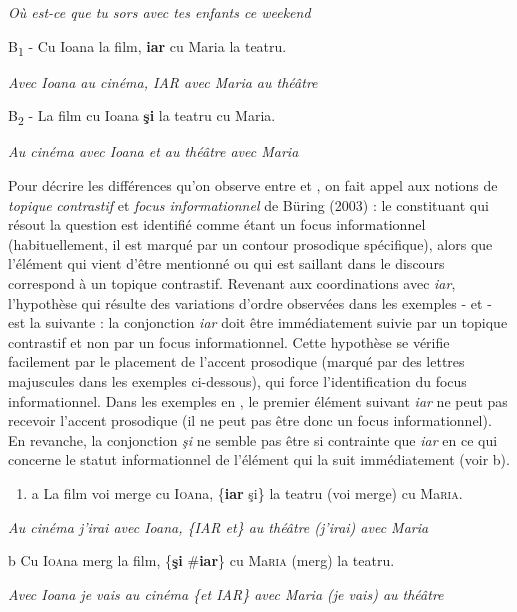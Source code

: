 {\itshape
Où est-ce que tu sors avec tes enfants ce weekend}

  B\textsubscript{1}  - Cu Ioana la film, \textbf{iar} cu Maria la teatru.

{\itshape
Avec Ioana au cinéma, IAR avec Maria au théâtre}

  B\textsubscript{2}  - La film cu Ioana \textbf{şi} la teatru cu Maria.

{\itshape
Au cinéma avec Ioana et au théâtre avec Maria} 

Pour décrire les différences qu'on observe entre  et , on fait appel aux notions de \textit{topique} \textit{contrastif} et \textit{focus informationnel} de Büring (2003) : le constituant qui résout la question est identifié comme étant un focus informationnel (habituellement, il est marqué par un contour prosodique spécifique), alors que l'élément qui vient d'être mentionné ou qui est saillant dans le discours correspond à un topique contrastif. Revenant aux coordinations avec \textit{iar}, l'hypothèse qui résulte des variations d'ordre observées dans les exemples - et - est la suivante : la conjonction \textit{iar} doit être immédiatement suivie par un topique contrastif et non par un focus informationnel. Cette hypothèse se vérifie facilement par le placement de l'accent prosodique (marqué par des lettres majuscules dans les exemples ci-dessous), qui force l'identification du focus informationnel. Dans les exemples en , le premier élément suivant \textit{iar} ne peut pas recevoir l'accent prosodique (il ne peut pas être donc un focus informationnel). En revanche, la conjonction \textit{şi} ne semble pas être si contrainte que \textit{iar} en ce qui concerne le statut informationnel de l'élément qui la suit immédiatement (voir b).


\begin{enumerate}
\item \label{bkm:Ref301977126}a  La film voi merge cu \textsc{Ioa}na, \{\textbf{iar {\textbar}} şi\} la teatru (voi merge) cu Ma\textsc{ria}.


\end{enumerate}
{\itshape
Au cinéma j'irai avec Ioana, \{IAR {\textbar} et\} au théâtre (j'irai) avec Maria}

  b  Cu I\textsc{oa}na merg la film, \{\textbf{şi} {\textbar} \#\textbf{iar}\} cu Ma\textsc{ria} (merg) la teatru.

{\itshape
Avec Ioana je vais au cinéma \{et {\textbar} IAR\} avec Maria (je vais) au théâtre}

